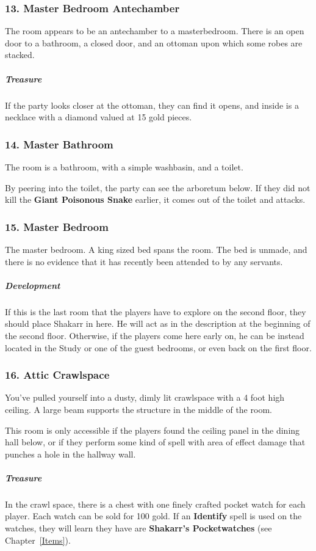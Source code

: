 \subsubsection{13. Master Bedroom Antechamber}
\begin{DndReadAloud}
    The room appears to be an antechamber to a masterbedroom. There is an open door to a bathroom, a closed door, and an ottoman upon which some robes are stacked.
    \end{DndReadAloud}
    \subparagraph{Treasure} If the party looks closer at the ottoman, they can find it opens, and inside is a necklace with a diamond valued at 15 gold pieces.
\subsubsection{14. Master Bathroom}
    \begin{DndReadAloud}
    The room is a bathroom, with a simple washbasin, and a toilet.
    \end{DndReadAloud}
    By peering into the toilet, the party can see the arboretum below. If they did not kill the \textbf{Giant Poisonous Snake} earlier, it comes out of the toilet and attacks.
\subsubsection{15. Master Bedroom}
\begin{DndReadAloud}
    The master bedroom. A king sized bed spans the room. The bed is unmade, and there is no evidence that it has recently been attended to by any servants.
    \end{DndReadAloud}
    \subparagraph{Development} If this is the last room that the players have to explore on the second floor, they should place Shakarr in here. He will act as in the description at the beginning of the second floor. Otherwise, if the players come here early on, he can be instead located in the Study or one of the guest bedrooms, or even back on the first floor.
\subsubsection{16. Attic Crawlspace}
\begin{DndReadAloud}
    You've pulled yourself into a dusty, dimly lit crawlspace with a 4 foot high ceiling. A large beam supports the structure in the middle of the room.
    \end{DndReadAloud}
This room is only accessible if the players found the ceiling panel in the dining hall below, or if they perform some kind of spell with area of effect damage that punches a hole in the hallway wall.
\subparagraph{Treasure}In the crawl space, there is a chest with one finely crafted pocket watch for each player. Each watch can be sold for 100 gold. If an \textbf{Identify} spell is used on the watches, they will learn they have are \textbf{Shakarr's Pocketwatches} (see Chapter~\ref{Items}).
